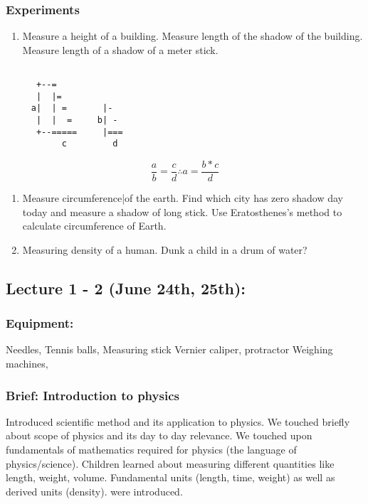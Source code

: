 \documentclass[11pt]{article}
\begin{document}
\subsubsection{Experiments}
\label{sec:orgaaaa3d0}
\begin{enumerate}
\item Measure a height of a building.
Measure length of the shadow of the building.
Measure length of a shadow of a meter stick.
\end{enumerate}
\begin{verbatim}

      +--=
      |  |=
     a|  | =       |-
      |  |  =     b| -
      +--=====     |===
           c         d

\end{verbatim}
\[
   \frac{a}{b} = \frac{c}{d} \therefore a = \frac{b * c}{d}
   \]

\begin{enumerate}
\item Measure circumference|of the earth.
Find which city has zero shadow day today and measure a shadow of long stick.
Use Eratosthenes's method to calculate circumference of Earth.

\item Measuring density of a human.
Dunk a child in a drum of water?
\end{enumerate}




\subsection{Lecture 1 - 2 (June 24th, 25th):}
\label{sec:org3016490}
\subsubsection{Equipment:}
\label{sec:orgaf9a1ed}
Needles, Tennis balls, Measuring stick
Vernier caliper, protractor
Weighing machines,

\subsubsection{Brief: Introduction to physics}
\label{sec:orgdeb5b57}

Introduced scientific method and its application to physics. We touched briefly
about scope of physics and its day to day relevance. We touched upon
fundamentals of mathematics required for physics (the language of
physics/science).
Children learned about measuring different quantities like length, weight,
volume. Fundamental units (length, time, weight) as well as derived units
(density). were introduced.
\end{document}
